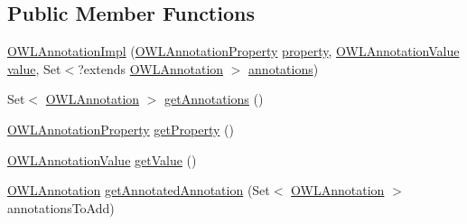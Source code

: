 \subsection*{Public Member Functions}
\begin{DoxyCompactItemize}
\item 
\hyperlink{classuk_1_1ac_1_1manchester_1_1cs_1_1owl_1_1owlapi_1_1_o_w_l_annotation_impl_afbdd9875de0cbc7e7eb73a9c5ee9f1fe}{O\-W\-L\-Annotation\-Impl} (\hyperlink{interfaceorg_1_1semanticweb_1_1owlapi_1_1model_1_1_o_w_l_annotation_property}{O\-W\-L\-Annotation\-Property} \hyperlink{classuk_1_1ac_1_1manchester_1_1cs_1_1owl_1_1owlapi_1_1_o_w_l_annotation_impl_ab61ebf1f881235ea4f922b75afc5419f}{property}, \hyperlink{interfaceorg_1_1semanticweb_1_1owlapi_1_1model_1_1_o_w_l_annotation_value}{O\-W\-L\-Annotation\-Value} \hyperlink{classuk_1_1ac_1_1manchester_1_1cs_1_1owl_1_1owlapi_1_1_o_w_l_annotation_impl_af4f4797d8db2e3b4b2112d798cf563ae}{value}, Set$<$?extends \hyperlink{interfaceorg_1_1semanticweb_1_1owlapi_1_1model_1_1_o_w_l_annotation}{O\-W\-L\-Annotation} $>$ \hyperlink{classuk_1_1ac_1_1manchester_1_1cs_1_1owl_1_1owlapi_1_1_o_w_l_annotation_impl_a097eeb1c93d1e69b51adf9e986695f28}{annotations})
\item 
Set$<$ \hyperlink{interfaceorg_1_1semanticweb_1_1owlapi_1_1model_1_1_o_w_l_annotation}{O\-W\-L\-Annotation} $>$ \hyperlink{classuk_1_1ac_1_1manchester_1_1cs_1_1owl_1_1owlapi_1_1_o_w_l_annotation_impl_a2ca41e57e2ecc57d4b1e281ce578daaf}{get\-Annotations} ()
\item 
\hyperlink{interfaceorg_1_1semanticweb_1_1owlapi_1_1model_1_1_o_w_l_annotation_property}{O\-W\-L\-Annotation\-Property} \hyperlink{classuk_1_1ac_1_1manchester_1_1cs_1_1owl_1_1owlapi_1_1_o_w_l_annotation_impl_aa4e5f03757bde05a18732b30889a43e6}{get\-Property} ()
\item 
\hyperlink{interfaceorg_1_1semanticweb_1_1owlapi_1_1model_1_1_o_w_l_annotation_value}{O\-W\-L\-Annotation\-Value} \hyperlink{classuk_1_1ac_1_1manchester_1_1cs_1_1owl_1_1owlapi_1_1_o_w_l_annotation_impl_a4be80ba05e4db0bf70b0cb2123093093}{get\-Value} ()
\item 
\hyperlink{interfaceorg_1_1semanticweb_1_1owlapi_1_1model_1_1_o_w_l_annotation}{O\-W\-L\-Annotation} \hyperlink{classuk_1_1ac_1_1manchester_1_1cs_1_1owl_1_1owlapi_1_1_o_w_l_annotation_impl_ab7bee9c8119c9aae0bab8e32b17c6463}{get\-Annotated\-Annotation} (Set$<$ \hyperlink{interfaceorg_1_1semanticweb_1_1owlapi_1_1model_1_1_o_w_l_annotation}{O\-W\-L\-Annotation} $>$ annotations\-To\-Add)
\item 

\end{DoxyCompactItemize}
